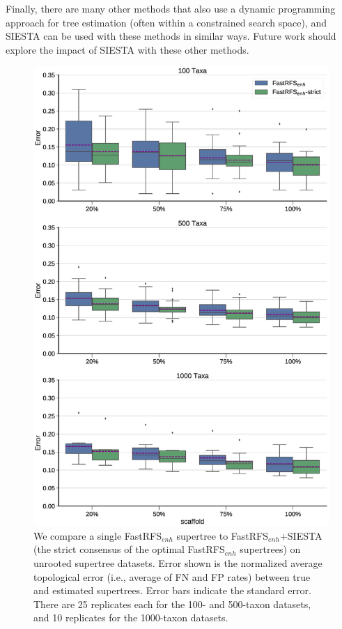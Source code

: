 Finally, there are many other methods  that also use a dynamic programming approach for tree estimation (often within a constrained search space), and SIESTA can be used with these methods in similar ways. Future work should explore the impact of SIESTA with these other methods. 



\begin{figure}[ht]
  \centering
\includegraphics[width=1\textwidth]{siesta-figs/fastrfs-enh-siesta-comparison}
\caption[Error rates for FastRFS$_{enh}$ and FastRFS$_{enh}$+SIESTA (strict consensus) on simulated datasets]{We compare a single FastRFS$_{enh}$ supertree to FastRFS$_{enh}$+SIESTA (the strict consensus of the optimal FastRFS$_{enh}$ supertrees) on unrooted supertree datasets.
Error shown is the normalized average topological error (i.e., average of FN and FP rates) between true and estimated supertrees.
Error bars indicate the standard error. 
There are 25 replicates each for the 100- and 500-taxon datasets, and 10 replicates for the 1000-taxon datasets.
   }
     \label{siesta::fig:supertree-error-unrooted}
\end{figure}



